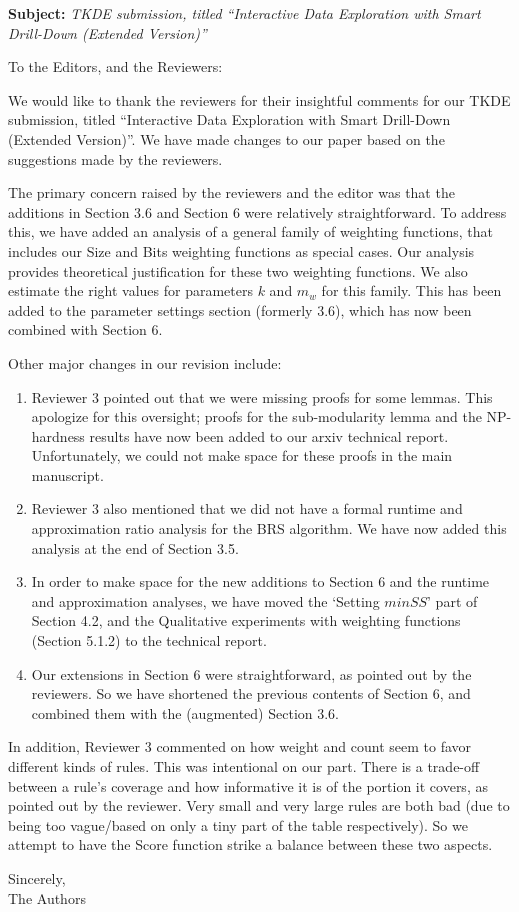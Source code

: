 \documentclass[11pt,a4paper]{letter}
\begin{document}
\begin{letter}
{{\bf Subject:} {\it TKDE submission, titled ``Interactive Data Exploration with Smart Drill-Down (Extended Version)''}}
\opening{To the Editors, and the Reviewers:}

We would like to thank the reviewers for their insightful comments for our TKDE submission, titled ``Interactive Data Exploration with Smart Drill-Down (Extended Version)''. We have made changes to our paper based on the suggestions made by the reviewers.

The primary concern raised by the reviewers and the editor was
that the additions in Section 3.6 and Section 6 were relatively straightforward. To address this, we have added an analysis of a general family of weighting functions, that includes our Size and Bits weighting functions as special cases. Our analysis provides theoretical justification for these two weighting functions. We also estimate the right values for parameters $k$ and $m_w$ for this family. This has been added to the parameter settings section (formerly 3.6), which has now been combined with Section 6.

Other major changes in our revision include: 
\begin{enumerate}
\item Reviewer 3 pointed out that we were missing proofs for some lemmas. This apologize for this oversight; proofs for the sub-modularity lemma and the NP-hardness results have now been added to our arxiv technical report. Unfortunately, we could not make space for these proofs in the main manuscript.
\item Reviewer 3 also mentioned that we did not have a formal runtime and approximation ratio analysis for the BRS algorithm. We have now added this analysis at the end of Section 3.5.
\item In order to make space for the new additions to Section 6 and the runtime and approximation analyses, we have moved the `Setting $minSS$' part of Section 4.2, and the Qualitative experiments with weighting functions (Section 5.1.2) to the technical report.
\item Our extensions in Section 6 were straightforward, as pointed out by the reviewers. So we have shortened the previous contents of Section 6, and combined them with the (augmented) Section 3.6.
\end{enumerate}

In addition, Reviewer 3 commented on how weight and count seem to favor different kinds of rules. This was intentional on our part. There is a trade-off between a rule's coverage and how informative it is of the portion it covers, as pointed out by the reviewer. Very small and very large rules are both bad (due to being too vague/based on only a tiny part of the table respectively). So we attempt to have the Score function strike a balance between these two aspects. 



\closing{Sincerely, \\
The Authors}
\end{letter}
\end{document}
